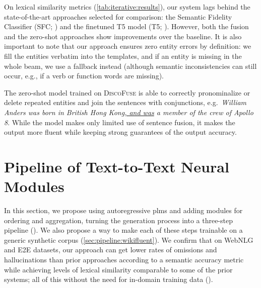 \documentclass[12pt,notitlepage,a4paper,oneside,openany]{report}
\renewcommand\cite{\citep}
\begin{document}
On lexical similarity metrics (\autoref{tab:iterative:results}), our system lags behind the state-of-the-art approaches selected for comparison: the Semantic Fidelity Classifier (SFC; \citealp{harkousHaveYourText2020}) and the finetuned T5 model (T5; \citealp{kaleTexttoTextPreTrainingDatatoText2020}). However, both the fusion and the zero-shot approaches show improvements over the baseline. It is also important to note that our approach ensures zero entity errors by definition: we fill the entities verbatim into the templates, and if an entity is missing in the whole beam, we use a fallback instead (although semantic inconsistencies can still occur, e.g., if a verb or function words are missing).

The zero-shot model trained on \textsc{DiscoFuse} is able to correctly pronominalize or delete repeated entities and join the sentences with conjunctions, e.g.\ \textit{William Anders was born in British Hong Kong\underline{, and was} a member of the crew of Apollo 8}. While the model makes only limited use of sentence fusion, it makes the output more fluent while keeping strong guarantees of the output accuracy.






\section{Pipeline of Text-to-Text Neural Modules}
\label{sec:pipeline}

In this section, we propose using autoregressive \acp{plm} and adding modules for ordering and aggregation, turning the generation process into a three-step pipeline (). We also propose a way to make each of these steps trainable on a generic synthetic corpus (\autoref{sec:pipeline:wikifluent}). We confirm that on WebNLG and E2E datasets, our approach can get lower rates of omissions and hallucinations than prior approaches according to a semantic accuracy metric while achieving levels of lexical similarity comparable to some of the prior systems; all of this without the need for in-domain training data ().
\end{document}
